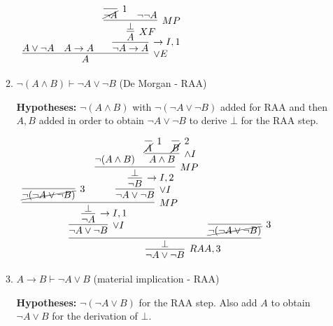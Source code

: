 \documentclass[11pt]{report}
\begin{document}
\begin{enumerate}
\begin{enumerate}
		\begin{mdframed}
			\begin{center}
				$\begin{array}{c}
					\infer[\lor E]{A}
						{A \lor \lnot A
						&
						A \to A
						&
						\infer[\to I,1]{\lnot A \to A}
							{\infer[XF]{A}
								{\infer[MP]{\bot}
									{\infer[1]{\cancel{\lnot A}}{}
									&
									\lnot \lnot A}}}}
				\end{array}$
			\end{center}
		\end{mdframed}

		\newpage
		\item $\neg( A \land  B) \vdash  \neg  A \lor \neg  B$ \hfill (De Morgan - RAA)
		
		\hspace{0.2cm}{\bf Solution}

		{\bf Hypotheses:} $\lnot (A \land B)$ with $\lnot(\lnot A \lor \lnot B)$ added for RAA and then $A,B$ added in order to obtain $\lnot A \lor \lnot B$ to derive $\bot$ for the RAA step. 

		\begin{mdframed}
			\begin{center}
				$\begin{array}{c}
					\infer[RAA,3]{\lnot A \lor \lnot B}
						{\infer[]{\bot}
							{\infer[\lor I]{\lnot A \lor \lnot B}
								{\infer[\to I,1]{\lnot A}
									{\infer[MP]{\bot}
										{\infer[3]{\cancel{\lnot(\lnot A \lor \lnot B)}}
											{}
										&
										\infer[\lor I]{\lnot A \lor \lnot B}
											{\infer[\to I,2]{\lnot B}
												{\infer[MP]{\bot}
													{\lnot(A \land B)
													&
													\infer[\land I]{A \land B}
														{\infer[1]{\cancel{A}}{}
														&
														\infer[2]{\cancel{B}}{}}}}}}}}
							&
							\infer[3]{\cancel{\lnot(\lnot A \lor \lnot B)}}{}}}
				\end{array}$
			\end{center}
		\end{mdframed}

		\item $ A \to  B \vdash  \neg  A \lor  B$ \hfill (material implication - RAA)
		
		\hspace{0.2cm}{\bf Solution}

		{\bf Hypotheses:} $\lnot(\lnot A \lor B)$ for the RAA step. Also add $A$ to obtain $\lnot A \lor B$ for the derivation of $\bot$. 


\end{enumerate}
\end{enumerate}
\end{document}
